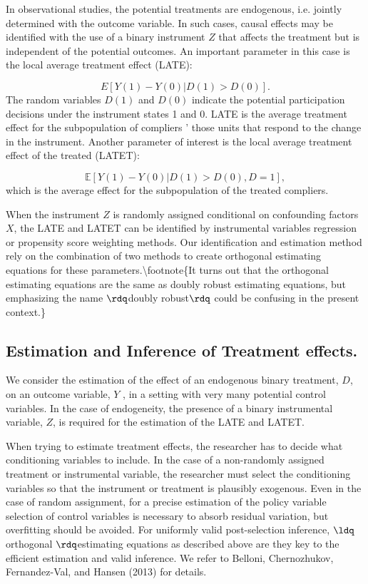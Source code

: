 \documentclass[12pt,a4paper]{article}
\begin{document}
In observational studies, the potential treatments are endogenous, i.e. jointly determined with the outcome variable. In such cases, causal effects may be identified with the use of a binary instrument $Z$ that affects the treatment but is independent of the potential outcomes. An important parameter in this case is the local average treatment effect (LATE):

\[
E[Y (1) - Y (0)|D(1) >  D(0)].
\]
The random variables $D(1)$ and $D(0)$ indicate the potential participation decisions under the instrument states 1 and 0. LATE is the average treatment effect for the subpopulation of compliers ' those units that respond to the change in the instrument. Another parameter of interest is the local average treatment effect of the treated (LATET):

\[
\mathbb E\left[Y (1) - Y (0)|D(1) > D(0), D = 1\right],
\]
which is the average effect for the subpopulation of the treated compliers.

When the instrument $Z$ is randomly assigned conditional on confounding factors $X$, the LATE and LATET can be identified by instrumental variables regression or propensity score weighting methods. Our identification and estimation method rely on the combination of two methods to create orthogonal estimating equations for these parameters.{\textbackslash}footnote\{It turns out that the orthogonal estimating equations are the same as doubly robust estimating equations, but emphasizing the name \ensuremath{\rdq}doubly robust\ensuremath{\rdq} could be confusing in the present context.\}

\subsection{Estimation and Inference of Treatment effects.}
We consider the estimation of the effect of an endogenous binary treatment, $D$, on an outcome variable, $Y$ , in a setting with very many potential control variables. In the case of endogeneity, the presence of a binary instrumental variable, $Z$, is required for the estimation of the LATE and LATET.

When trying to estimate treatment effects, the researcher has to decide what conditioning variables to include. In the case of a non-randomly assigned treatment or instrumental variable, the researcher must select the conditioning variables so that the instrument or treatment is plausibly exogenous. Even in the case of random assignment, for a precise estimation of the policy variable selection of control variables is necessary to absorb residual variation, but overfitting should be avoided. For uniformly valid post-selection inference, \ensuremath{\ldq}orthogonal \ensuremath{\rdq}estimating equations as described above are they key to the efficient estimation and valid inference. We refer to Belloni, Chernozhukov, Fernandez-Val, and Hansen (2013) for details.
\end{document}
